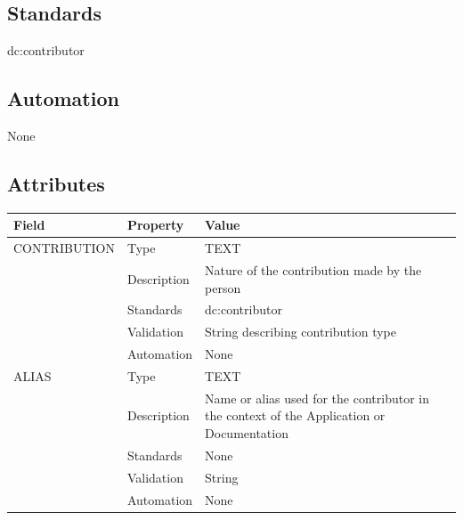\subsection{Standards}\label{standards-11}

dc:contributor

\subsection{Automation}\label{automation-11}

None

\subsection{Attributes}\label{attributes-11}

\begin{longtable}[]{@{}
  >{\raggedright\arraybackslash}p{}
  >{\raggedright\arraybackslash}p{}
  >{\raggedright\arraybackslash}p{}@{}}
\toprule\noalign{}
\begin{minipage}[b]{\linewidth}\raggedright
Field
\end{minipage} & \begin{minipage}[b]{\linewidth}\raggedright
Property
\end{minipage} & \begin{minipage}[b]{\linewidth}\raggedright
Value
\end{minipage} \\
\midrule\noalign{}
\endhead
\bottomrule\noalign{}
\endlastfoot
CONTRIBUTION & Type & TEXT \\
& Description & Nature of the contribution made by the person \\
& Standards & dc:contributor \\
& Validation & String describing contribution type \\
& Automation & None \\
ALIAS & Type & TEXT \\
& Description & Name or alias used for the contributor in the context of
the Application or Documentation \\
& Standards & None \\
& Validation & String \\
& Automation & None \\
\end{longtable}

